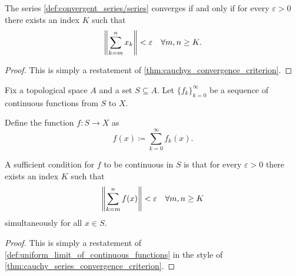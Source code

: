 \begin{proposition}\label{thm:cauchy_series_convergence_criterion}\cite[3.22]{Rudin1991}
  The series \cref{def:convergent_series/series} converges if and only if for every \( \varepsilon > 0 \) there exists an index \( K \) such that
  \begin{equation*}
    \left\Vert \sum_{k=m}^n x_k \right\Vert < \varepsilon \quad\forall m, n \geq K.
  \end{equation*}
\end{proposition}
\begin{proof}
  This is simply a restatement of \cref{thm:cauchys_convergence_criterion}.
\end{proof}

\begin{proposition}\label{thm:cauchy_series_continuity_criterion}\cite[]{Фихтенгольц1968/2}
  Fix a topological space \( A \) and a set \( S \subseteq A \). Let \( \{ f_k \}_{k=0}^\infty \) be a sequence of continuous functions from \( S \) to \( X \).

  Define the function \( f: S \to X \) as
  \begin{equation}\label{thm:cauchy_series_continuity_criterion/function}
    f(x) \coloneqq \sum_{k=0}^\infty f_k(x).
  \end{equation}

  A sufficient condition for \( f \) to be continuous in \( S \) is that for every \( \varepsilon > 0 \) there exists an index \( K \) such that
  \begin{equation*}
    \left\Vert \sum_{k=m}^n f(x) \right\Vert < \varepsilon \quad\forall m, n \geq K
  \end{equation*}
  simultaneously for all \( x \in S \).
\end{proposition}
\begin{proof}
  This is simply a restatement of \cref{def:uniform_limit_of_continuous_functions} in the style of \cref{thm:cauchy_series_convergence_criterion}.
\end{proof}

